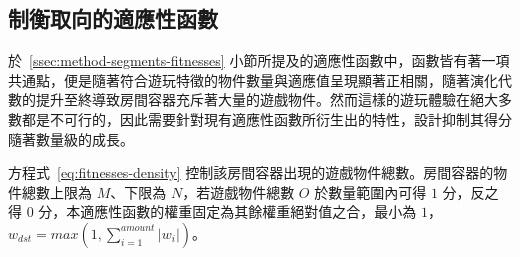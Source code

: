 








\subsection{制衡取向的適應性函數}
\label{ssec:method-segments-balancefitness}

於~\ref{ssec:method-segments-fitnesses} 小節所提及的適應性函數中，函數皆有著一項共通點，便是隨著符合遊玩特徵的物件數量與適應值呈現顯著正相關，隨著演化代數的提升至終導致房間容器充斥著大量的遊戲物件。然而這樣的遊玩體驗在絕大多數都是不可行的，因此需要針對現有適應性函數所衍生出的特性，設計抑制其得分隨著數量級的成長。

方程式~\ref{eq:fitnesses-density} 控制該房間容器出現的遊戲物件總數。房間容器的物件總數上限為 $M$、下限為 $N$，若遊戲物件總數 $O$ 於數量範圍內可得 $1$ 分，反之得 $0$ 分，本適應性函數的權重固定為其餘權重絕對值之合，最小為 $1$， $w_{dst} = max(1, \sum_{i=1}^{amount} \lvert w_{i}\rvert)$。

